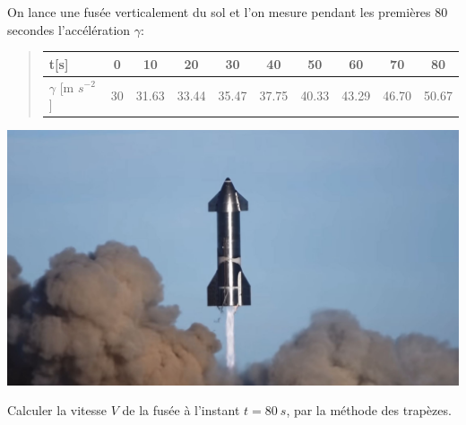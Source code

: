 \documentclass[%
oneside,                 %
final,                   %
10pt,french]{article}
\newenvironment{doconceexercise}{}{}
\newcounter{doconceexercisecounter}
\begin{document}
\begin{doconceexercise}



On lance une fusée verticalement du sol et l’on mesure pendant les premières 80 secondes l'accélération $\gamma$:


\begin{quote}
\begin{tabular}{lccccccccc}
\hline
\multicolumn{1}{l}{ t[s] } & \multicolumn{1}{c}{ 0 } & \multicolumn{1}{c}{ 10 } & \multicolumn{1}{c}{ 20 } & \multicolumn{1}{c}{ 30 } & \multicolumn{1}{c}{ 40 } & \multicolumn{1}{c}{ 50 } & \multicolumn{1}{c}{ 60 } & \multicolumn{1}{c}{ 70 } & \multicolumn{1}{c}{ 80 } \\
\hline
$\gamma$ [m $s^{-2}$] & 30 & 31.63 & 33.44 & 35.47 & 37.75 & 40.33 & 43.29 & 46.70 & 50.67 \\
\hline
\end{tabular}
\end{quote}

\noindent


\vspace{6mm}

\centerline{\includegraphics[width=0.7\linewidth]{imgs/SpaceX-Starship.jpg}}

\vspace{6mm}




Calculer la vitesse $V$ de la fusée à l’instant $t=80 \ s$, par la méthode des trapèzes.


\end{doconceexercise}
\end{document}
